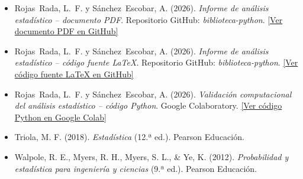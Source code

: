 \documentclass[12pt,letterpaper]{article}
\begin{document}
\begin{itemize}[leftmargin=1.2cm]
    \raggedright %

    \item Rojas~Rada, L.~F. y Sánchez~Escobar, A. (2026).
    \textit{Informe de análisis estadístico -- documento PDF}.
    Repositorio GitHub: \textit{biblioteca-python}.
    \href{https://github.com/LuisRojasR/biblioteca-prophet-python/blob/8c94871bae57a6c5d2d7cae6ed869f459f7d535e/Talleres%20Probabilidad%20y%20Estadistica/Informe%20de%20an%C3%A1lisis%20estad%C3%ADstico.pdf}{[Ver documento PDF en GitHub]}

    \item Rojas~Rada, L.~F. y Sánchez~Escobar, A. (2026).
    \textit{Informe de análisis estadístico -- código fuente \LaTeX{}}.
    Repositorio GitHub: \textit{biblioteca-python}.
    \href{https://github.com/LuisRojasR/biblioteca-prophet-python/blob/ddd6b70649beb38648a4b15fad86241a9cfda42d/Talleres%20Probabilidad%20y%20Estadistica/Informe%20de%20an%C3%A1lisis%20estad%C3%ADstico(LATEX).tex}{[Ver código fuente \LaTeX{} en GitHub]}

    \item Rojas~Rada, L.~F. y Sánchez~Escobar, A. (2026).
    \textit{Validación computacional del análisis estadístico -- código Python}.
    Google Colaboratory.
    \href{https://colab.research.google.com/drive/1riZwUWHigjchCFgcGBNGb3CCEc0Y06RA?usp=sharing}{[Ver código Python en Google Colab]}

    \item Triola, M. F. (2018). \textit{Estadística} (12.ª ed.). Pearson Educación.

    \item Walpole, R. E., Myers, R. H., Myers, S. L., \& Ye, K. (2012).
    \textit{Probabilidad y estadística para ingeniería y ciencias} (9.ª ed.).
    Pearson Educación.
\end{itemize}
\end{document}
